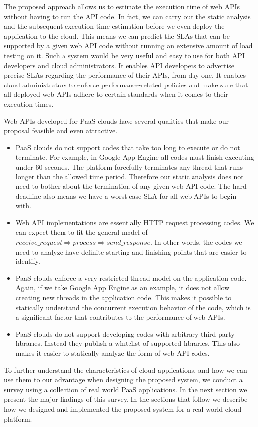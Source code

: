 The proposed approach allows us to estimate the execution time of web APIs without having to
run the API code.
In fact, we can carry out the static analysis and the subsequent execution time
estimation before we even deploy the application to the cloud. 
This means we can predict the SLAs that can be supported by a given web API code
without running an extensive amount of load testing on it. 
Such a system would be very useful and
easy to use for both API developers and cloud administrators. It enables API developers
to advertise precise SLAs regarding the performance of their APIs, from day one. It enables
cloud administrators to enforce performance-related policies and make sure that all deployed 
web APIs adhere to certain standards when it comes to their execution times.

Web APIs developed for PaaS clouds have several qualities that make our proposal
feasible and even attractive.

\begin{itemize}
\item PaaS clouds do not support codes that take too long to execute or do not terminate. For 
example, in Google App Engine all codes must finish executing under 60 seconds.
The platform forcefully terminates any thread that runs longer than the allowed time period.
Therefore our static analysis does not need to bother about the termination of any given web API
code. The hard deadline also means we have a worst-case SLA for all web APIs to begin with.
\item Web API implementations are essentially HTTP request processing codes. We can expect them
to fit the general model of $receive\_request \Rightarrow process \Rightarrow send\_response$. In
other words, the codes we need to analyze have definite starting and finishing points that are easier
to identify.
\item PaaS clouds enforce a very restricted thread model on the application code. Again, if we take
Google App Engine as an example, it does not allow creating new threads in the application code. This
makes it possible to statically understand the concurrent execution behavior of the code, which is a significant
factor that contributes to the performance of web APIs.
\item PaaS clouds do not support developing codes with arbitrary third party libraries. Instead they
publish a whitelist of supported libraries. This also makes it easier to statically analyze the form of web API codes.
\end{itemize}

To further understand the characteristics of cloud applications, and how we can use them to our
advantage when designing the proposed system, we conduct a survey
using a collection of real world PaaS applications. In the next section we present the major findings
of this survey.
In the sections that follow we describe how we designed and implemented the proposed system
 for a real world cloud platform.